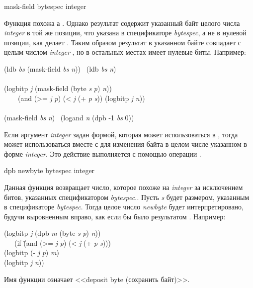 \begin{defun}[Функция]
mask-field bytespec integer

Функция похожа а . Однако результат содержит указанный байт целого
числа \emph{integer} в той же позиции, что указана в спецификаторе
\emph{bytespec}, а не в нулевой позиции, как делает .
Таким образом результат в указанном байте совпадает с целым числом
\emph{integer} , но в остальных местах имеет нулевые биты.
Например:
\begin{lisp}
(ldb \emph{bs} (mask-field \emph{bs} \emph{n})) \EQ\ (ldb \emph{bs} \emph{n}) \\
 \\
(logbitp \emph{j} (mask-field (byte \emph{s} \emph{p}) \emph{n})) \\
~~~\EQ\ (and (>= \emph{j} \emph{p}) (< \emph{j} (+ \emph{p} \emph{s})) (logbitp \emph{j} \emph{n})) \\
 \\
(mask-field \emph{bs} \emph{n}) \EQ\ (logand \emph{n} (dpb -1 \emph{bs} 0))
\end{lisp}

Если аргумент \emph{integer} задан формой, которая может использоваться в
, тогда  может использоваться вместе с  для
изменения байта в целом числе указанном в форме \emph{integer}.
Это действие выполняется с помощью операции .
\end{defun}

\begin{defun}[Функция]
dpb newbyte bytespec integer

Данная функция возвращает число, которое похоже на \emph{integer} за исключением
 битов, указанных спецификатором \emph{bytespec.}. Пусть \emph{s} будет
 размером, указанным в спецификаторе \emph{bytespec}.
Тогда целое число \emph{newbyte} будет интерпретировано, будучи выровненным вправо,
как если бы было результатом .
Например:
\begin{lisp}
(logbitp \emph{j} (dpb \emph{m} (byte \emph{s} \emph{p}) \emph{n})) \\
~~\EQ\ (if \=(and (>= \emph{j} \emph{p}) (< \emph{j} (+ \emph{p} \emph{s}))) \\
\>(logbitp (- \emph{j} \emph{p}) \emph{m}) \\
\>(logbitp \emph{j} \emph{n}))
\end{lisp}
Имя функции  означает <<deposit byte (сохранить байт)>>.
\end{defun}

